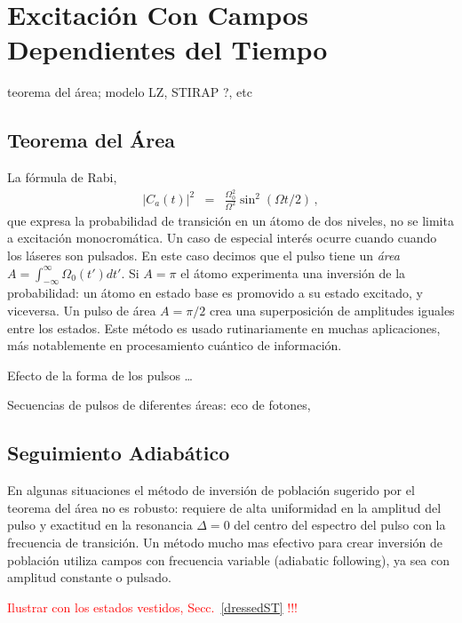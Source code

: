 \documentclass[twocolumn,aps,eqsecnum]{revtex4}
\begin{document}
\section{Excitaci\'on Con Campos Dependientes del Tiempo} 
teorema del \'area; modelo LZ, STIRAP ?, etc

\subsection{Teorema del \'Area}
La f\'ormula de Rabi, 
%
\begin{eqnarray} 	\label{eq:RabiFormula}
|C_a (t)|^2 &=& \frac{\Omega_0^2}{\Omega^2} \sin^2{(\Omega t/2)}  \,,  
\end{eqnarray}
que expresa la probabilidad de transici\'on en un \'atomo de dos niveles, 
no se limita a excitaci\'on monocrom\'atica. Un caso de especial inter\'es 
ocurre cuando cuando los l\'aseres son pulsados. En este caso decimos 
que el pulso tiene un \textit{\'area}  
$A = \int_{-\infty}^{\infty} \Omega_0 (t') dt' $. Si $A=\pi$ el \'atomo 
experimenta una inversi\'on de la probabilidad: un \'atomo en estado 
base es promovido a su estado excitado, y viceversa. Un pulso de \'area 
$A=\pi/2$ crea una superposici\'on de amplitudes iguales entre los estados. 
Este m\'etodo es usado rutinariamente en muchas aplicaciones, m\'as 
notablemente en procesamiento cu\'antico de informaci\'on.   

Efecto de la forma de los pulsos \ldots 

Secuencias de pulsos de diferentes \'areas: eco de fotones,  

\subsection{Seguimiento Adiab\'atico}
En algunas situaciones el m\'etodo de inversi\'on de poblaci\'on sugerido 
por el teorema del \'area no es robusto: requiere de alta uniformidad en la 
amplitud del pulso y exactitud en la resonancia $\Delta =0$ del centro del 
espectro del pulso con la frecuencia de transici\'on. Un m\'etodo mucho 
mas efectivo para crear inversi\'on de poblaci\'on utiliza campos con 
frecuencia variable (adiabatic following), ya sea con amplitud constante 
o pulsado.  

\textcolor{red}{Ilustrar con los estados vestidos, Secc.~\ref{dressedST} !!!}
\end{document}
